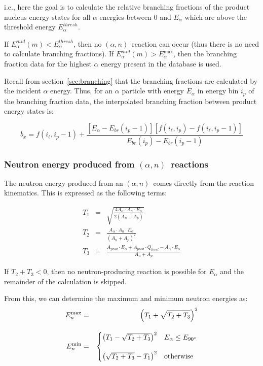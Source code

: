 \documentclass[10pt]{article}
\newcommand{\alphn}[0]{$\left(\alpha,n\right)$}
\begin{document}
i.e., here the goal is to calculate the relative branching fractions of the product nucleus energy states for all $\alpha$ energies between 0 and $E_\alpha$ which are above the threshold energy $E_\alpha^{thresh}$.

If $E_\alpha^{mid}\left(m\right)<E_\alpha^{thresh}$, then no \alphn\ reaction can occur (thus there is no need to calculate branching fractions). If $E_\alpha^{mid}\left(m\right) > E_\alpha^{\max}$, then the branching fraction data for the highest $\alpha$ energy present in the database is used.

Recall from section~\ref{sec:branching} that the branching fractions are calculated by the incident $\alpha$ energy. Thus, for an $\alpha$ particle with energy $E_\alpha$ in energy bin $i_p$ of the branching fraction data, the interpolated branching fraction between product energy states is:

\begin{equation}
\displaystyle b_x = f\left(i_\ell, i_p-1\right) + \frac{ \left[ E_\alpha - E_{br} \left( i_p-1 \right) \right] \left[ f\left( i_\ell, i_p\right) - f\left(i_\ell, i_p-1\right) \right] }{ E_{br}\left(i_p \right) - E_{br}\left(i_p-1\right) }
\end{equation}


\subsubsection{Neutron energy produced from \alphn\ reactions}

The neutron energy produced from an \alphn\ comes directly from the reaction kinematics. This is expressed as the following terms:

\begin{eqnarray}
T_1 & = & \sqrt{\frac{4 A_\alpha \cdot A_n \cdot E_\alpha}{2 \left(A_n + A_p \right) } } \\
T_2 & = & \frac{A_\alpha \cdot A_n \cdot E_\alpha}{\left(A_n + A_p \right)^2 } \\
T_3 & = & \frac{ A_{prod} \cdot E_\alpha + A_{prod}   \cdot Q_{level} - A_\alpha \cdot E_\alpha}{A_n + A_p}
\end{eqnarray}

If $T_2 + T_3 < 0$, then no neutron-producing reaction is possible for $E_\alpha$ and the remainder of the calculation is skipped.

From this, we can determine the maximum and minimum neutron energies as:
\begin{eqnarray}
E_n^{\max} & = &  \left( T_1 + \sqrt{T_2 + T_3} \right)^2 \\[10pt]
E_n^{\min} & = & 
\begin{cases}
\left(T_1 - \sqrt{T_2 + T_3}\right)^2 & E_\alpha \leq E_{90\degree} \\[12pt]
\left(\sqrt{T_2 + T_3}-T_1\right)^2 & \mathrm{otherwise}
\end{cases}
\end{eqnarray}
\end{document}
